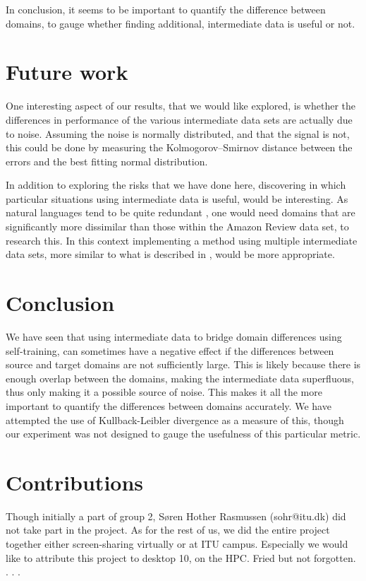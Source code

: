 \documentclass[11pt,a4paper]{article}
\begin{document}
In conclusion, it seems to be important to quantify the difference between domains, to gauge whether finding additional, intermediate data is useful or not.

\section*{Future work}
One interesting aspect of our results, that we would like explored, is whether the differences in performance of the various intermediate data sets are actually due to noise. Assuming the noise is normally distributed, and that the signal is not, this could be done by measuring the Kolmogorov–Smirnov distance between the errors and the best fitting normal distribution.

In addition to exploring the risks that we have done here, discovering in which particular situations using intermediate data is useful, would be interesting.
As natural languages tend to be quite redundant \cite{yarowsky1995unsupervised}, one would need domains that are significantly more dissimilar than those within the Amazon Review data set, to research this. In this context implementing a method using multiple intermediate data sets, more similar to what is described in \citet{kumar2020understanding}, would be more appropriate.

\section*{Conclusion}
We have seen that using intermediate data to bridge domain differences using self-training, can sometimes have a negative effect if the differences between source and target domains are not sufficiently large.
This is likely because there is enough overlap between the domains, making the intermediate data superfluous, thus only making it a possible source of noise.
This makes it all the more important to quantify the differences between domains accurately. We have attempted the use of Kullback-Leibler divergence as a measure of this, though our experiment was not designed to gauge the usefulness of this particular metric.





\section*{Contributions}
Though initially a part of group 2, Søren Hother Rasmussen (sohr@itu.dk) did not take part in the project. 
As for the rest of us, we did the entire project together either screen-sharing virtually or at ITU campus.
Especially we would like to attribute this project to desktop 10, on the HPC. Fried but not forgotten. . . .
\end{document}
